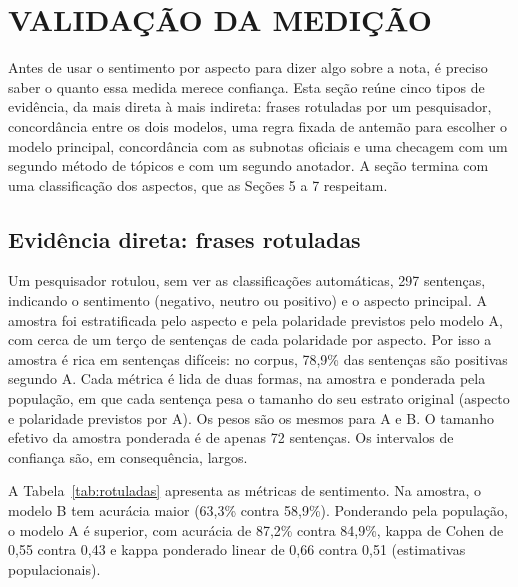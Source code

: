 \section{VALIDAÇÃO DA MEDIÇÃO}

Antes de usar o sentimento por aspecto para dizer algo sobre a nota, é preciso saber o quanto essa medida merece confiança. Esta seção reúne cinco tipos de evidência, da mais direta à mais indireta: frases rotuladas por um pesquisador, concordância entre os dois modelos, uma regra fixada de antemão para escolher o modelo principal, concordância com as subnotas oficiais e uma checagem com um segundo método de tópicos e com um segundo anotador. A seção termina com uma classificação dos aspectos, que as Seções 5 a 7 respeitam.

\subsection{Evidência direta: frases rotuladas}

Um pesquisador rotulou, sem ver as classificações automáticas, 297 sentenças, indicando o sentimento (negativo, neutro ou positivo) e o aspecto principal. A amostra foi estratificada pelo aspecto e pela polaridade previstos pelo modelo A, com cerca de um terço de sentenças de cada polaridade por aspecto. Por isso a amostra é rica em sentenças difíceis: no corpus, 78,9\% das sentenças são positivas segundo A. Cada métrica é lida de duas formas, na amostra e ponderada pela população, em que cada sentença pesa o tamanho do seu estrato original (aspecto e polaridade previstos por A). Os pesos são os mesmos para A e B. O tamanho efetivo da amostra ponderada é de apenas 72 sentenças. Os intervalos de confiança são, em consequência, largos.

A Tabela~\ref{tab:rotuladas} apresenta as métricas de sentimento. Na amostra, o modelo B tem acurácia maior (63,3\% contra 58,9\%). Ponderando pela população, o modelo A é superior, com acurácia de 87,2\% contra 84,9\%, kappa de Cohen de 0,55 contra 0,43 e kappa ponderado linear de 0,66 contra 0,51 (estimativas populacionais).

